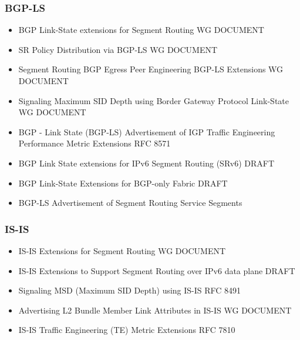 {\subsubsection{BGP-LS}
\begin{itemize}
    \item BGP Link-State extensions for Segment Routing WG DOCUMENT \cite{ietf-idr-bgp-ls-segment-routing-ext}
    \item SR Policy Distribution via BGP-LS WG DOCUMENT \cite{ietf-idr-te-lsp-distribution}
    \item Segment Routing BGP Egress Peer Engineering BGP-LS Extensions WG DOCUMENT \cite{ietf-idr-bgpls-segment-routing-epe}
    \item Signaling Maximum SID Depth using Border Gateway Protocol Link-State WG DOCUMENT \cite{ietf-idr-bgp-ls-segment-routing-msd}
    \item BGP - Link State (BGP-LS) Advertisement of IGP Traffic Engineering Performance Metric Extensions RFC 8571 \cite{rfc8571}
    \item BGP Link State extensions for IPv6 Segment Routing (SRv6) DRAFT \cite{ietf-idr-bgpls-srv6-ext}
    \item BGP Link-State Extensions for BGP-only Fabric DRAFT \cite{ketant-idr-bgp-ls-bgp-only-fabric}
    \item BGP-LS Advertisement of Segment Routing Service Segments \cite{dawra-idr-bgp-ls-sr-service-segments}
\end{itemize}    
\subsubsection{IS-IS}
\begin{itemize}
    \item IS-IS Extensions for Segment Routing WG DOCUMENT \cite{ietf-isis-segment-routing-extensions}
    \item IS-IS Extensions to Support Segment Routing over IPv6 data plane DRAFT \cite{id-isis-srv6-extensions}
    \item Signaling MSD (Maximum SID Depth) using IS-IS RFC 8491 \cite{rfc8491}
    \item Advertising L2 Bundle Member Link Attributes in IS-IS WG DOCUMENT \cite{ietf-isis-l2bundles}
    \item IS-IS Traffic Engineering (TE) Metric Extensions RFC 7810 \cite{rfc7810}
\end{itemize}    
}

